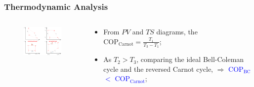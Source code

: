 \documentclass[10pt,compress]{beamer}
\newcommand{\frc}{\displaystyle\frac}
\begin{document}
\begin{frame}
 \frametitle{Thermodynamic Analysis}
  \begin{columns}

   \begin{column}[c]{0.55\linewidth}
    \begin{figure}%
     \begin{center}
      \includegraphics[width=6.8cm,height=6.cm]{./Pics/Overview_Refrig8}
     \end{center}
    \end{figure}  
   \end{column}  


   \begin{column}[c]{0.45\linewidth}
    \begin{itemize}
     \item <1-> From $PV$ and $TS$ diagrams, the $\text{COP}_{\text{Carnot}}=\frc{T_{1}}{T_{3}-T_{1}}$;
     \item <2-> As $T_{2}>T_{3}$, comparing the ideal Bell-Coleman cycle and the reversed Carnot cycle, $\Longrightarrow$ \textcolor{blue}{COP$_{\text{BC}}$ $<$ COP$_{\text{Carnot}}$};
    \end{itemize}
   \end{column}
  \end{columns}

\end{frame}
\end{document}
